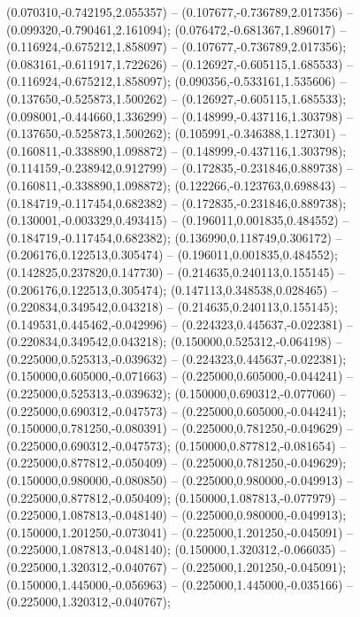 (0.070310,-0.742195,2.055357) -- (0.107677,-0.736789,2.017356) -- (0.099320,-0.790461,2.161094);
 (0.076472,-0.681367,1.896017) -- (0.116924,-0.675212,1.858097) -- (0.107677,-0.736789,2.017356);
 (0.083161,-0.611917,1.722626) -- (0.126927,-0.605115,1.685533) -- (0.116924,-0.675212,1.858097);
 (0.090356,-0.533161,1.535606) -- (0.137650,-0.525873,1.500262) -- (0.126927,-0.605115,1.685533);
 (0.098001,-0.444660,1.336299) -- (0.148999,-0.437116,1.303798) -- (0.137650,-0.525873,1.500262);
 (0.105991,-0.346388,1.127301) -- (0.160811,-0.338890,1.098872) -- (0.148999,-0.437116,1.303798);
 (0.114159,-0.238942,0.912799) -- (0.172835,-0.231846,0.889738) -- (0.160811,-0.338890,1.098872);
 (0.122266,-0.123763,0.698843) -- (0.184719,-0.117454,0.682382) -- (0.172835,-0.231846,0.889738);
 (0.130001,-0.003329,0.493415) -- (0.196011,0.001835,0.484552) -- (0.184719,-0.117454,0.682382);
 (0.136990,0.118749,0.306172) -- (0.206176,0.122513,0.305474) -- (0.196011,0.001835,0.484552);
 (0.142825,0.237820,0.147730) -- (0.214635,0.240113,0.155145) -- (0.206176,0.122513,0.305474);
 (0.147113,0.348538,0.028465) -- (0.220834,0.349542,0.043218) -- (0.214635,0.240113,0.155145);
 (0.149531,0.445462,-0.042996) -- (0.224323,0.445637,-0.022381) -- (0.220834,0.349542,0.043218);
 (0.150000,0.525312,-0.064198) -- (0.225000,0.525313,-0.039632) -- (0.224323,0.445637,-0.022381);
 (0.150000,0.605000,-0.071663) -- (0.225000,0.605000,-0.044241) -- (0.225000,0.525313,-0.039632);
 (0.150000,0.690312,-0.077060) -- (0.225000,0.690312,-0.047573) -- (0.225000,0.605000,-0.044241);
 (0.150000,0.781250,-0.080391) -- (0.225000,0.781250,-0.049629) -- (0.225000,0.690312,-0.047573);
 (0.150000,0.877812,-0.081654) -- (0.225000,0.877812,-0.050409) -- (0.225000,0.781250,-0.049629);
 (0.150000,0.980000,-0.080850) -- (0.225000,0.980000,-0.049913) -- (0.225000,0.877812,-0.050409);
 (0.150000,1.087813,-0.077979) -- (0.225000,1.087813,-0.048140) -- (0.225000,0.980000,-0.049913);
 (0.150000,1.201250,-0.073041) -- (0.225000,1.201250,-0.045091) -- (0.225000,1.087813,-0.048140);
 (0.150000,1.320312,-0.066035) -- (0.225000,1.320312,-0.040767) -- (0.225000,1.201250,-0.045091);
 (0.150000,1.445000,-0.056963) -- (0.225000,1.445000,-0.035166) -- (0.225000,1.320312,-0.040767);
